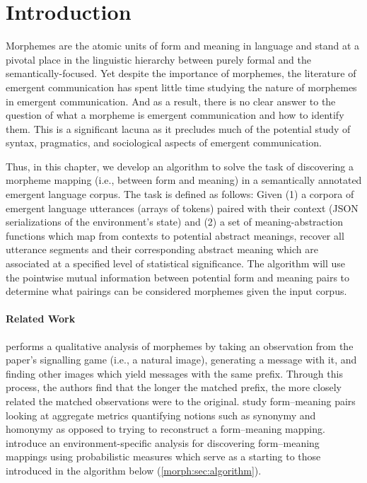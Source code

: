 \section{Introduction}
Morphemes are the atomic units of form and meaning in language and stand at a pivotal place in the linguistic hierarchy between purely formal and the semantically-focused.
Yet despite the importance of morphemes, the literature of emergent communication has spent little time studying the nature of morphemes in emergent communication.
And as a result, there is no clear answer to the question of what a morpheme is emergent communication and how to identify them.
This is a significant lacuna as it precludes much of the potential study of syntax, pragmatics, and sociological aspects of emergent communication.

Thus, in this chapter, we develop an algorithm to solve the task of discovering a morpheme mapping (i.e., between form and meaning) in a semantically annotated emergent language corpus.
The task is defined as follows:
Given
  (1) a corpora of emergent language utterances (arrays of tokens) paired with their context (JSON serializations of the environment's state)
  and (2) a set of meaning-abstraction functions which map from contexts to potential abstract meanings,
recover all utterance segments and their corresponding abstract meaning which are associated at a specified level of statistical significance.
The algorithm will use the pointwise mutual information between potential form and meaning pairs to determine what pairings can be considered morphemes given the input corpus.






\paragraph{Related Work}
\citet{havrylov2017sequence} performs a qualitative analysis of morphemes by taking an observation from the paper's signalling game (i.e., a natural image), generating a message with it, and finding other images which yield messages with the same prefix.
Through this process, the authors find that the longer the matched prefix, the more closely related the matched observations were to the original.
\citet{conklin2023compositionality} study form--meaning pairs looking at aggregate metrics quantifying notions such as synonymy and homonymy as opposed to trying to reconstruct a form--meaning mapping.
\citet{lipinski2024speaking} introduce an environment-specific analysis for discovering form--meaning mappings using probabilistic measures which serve as a starting to those introduced in the algorithm below (\cref{morph:sec:algorithm}).

